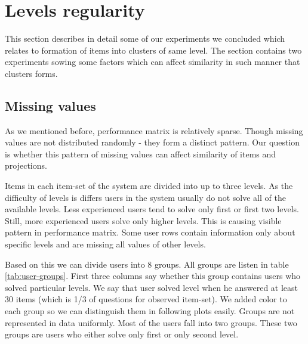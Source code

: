 \documentclass[
  digital, %
  table,   %
  nolof,     %
  nolot,     %
  nocover
]{fithesis3}
\begin{document}

\section{Levels regularity}\label{evaulation-levels-regularity}

This section describes in detail some of our experiments we concluded which relates to formation of items into clusters of same level. The section contains two experiments sowing some factors which can affect similarity in such manner that clusters forms.


\subsection{Missing values}\label{missing-values}


As we mentioned before, performance matrix is relatively sparse. Though missing values are not distributed randomly - they form a distinct pattern. Our question is whether this pattern of missing values can affect similarity of items and projections.


Items in each item-set of the system are divided into up to three levels. As the difficulty of levels is differs users in the system usually do not solve all of the available levels. Less experienced users tend to solve only first or first two levels. Still, more experienced users solve only higher levels. This is causing visible pattern in performance matrix. Some user rows contain information only about specific levels and are missing all values of other levels.


Based on this we can divide users into 8 groups. All groups are listen in table \ref{tab:user-groups}. First three columns say whether this group contains users who solved particular levels. We say that user solved level when he answered at least 30 items (which is 1/3 of questions for observed item-set). We added color to each group so we can distinguish them in following plots easily. Groups are not represented in data uniformly. Most of the users fall into two groups. These two groups are users who either solve only first or only second level.
\end{document}
